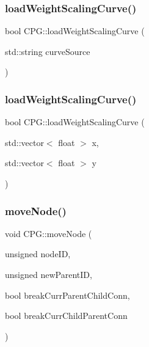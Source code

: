 \subsubsection{\texorpdfstring{load\+Weight\+Scaling\+Curve()}{loadWeightScalingCurve()}\hspace{0.1cm}{\footnotesize\ttfamily [1/2]}}
{\footnotesize\ttfamily bool C\+P\+G\+::load\+Weight\+Scaling\+Curve (\begin{DoxyParamCaption}\item[{std\+::string}]{curve\+Source }\end{DoxyParamCaption})}

\mbox{\label{classCPG_a8e1cb030a864fc7aecbe9e394b0b6e03}} 
\subsubsection{\texorpdfstring{load\+Weight\+Scaling\+Curve()}{loadWeightScalingCurve()}\hspace{0.1cm}{\footnotesize\ttfamily [2/2]}}
{\footnotesize\ttfamily bool C\+P\+G\+::load\+Weight\+Scaling\+Curve (\begin{DoxyParamCaption}\item[{std\+::vector$<$ float $>$}]{x,  }\item[{std\+::vector$<$ float $>$}]{y }\end{DoxyParamCaption})}

\mbox{\label{classCPG_a052ebefc34a7b11931b49136d7642584}} 
\subsubsection{\texorpdfstring{move\+Node()}{moveNode()}}
{\footnotesize\ttfamily void C\+P\+G\+::move\+Node (\begin{DoxyParamCaption}\item[{unsigned}]{node\+ID,  }\item[{unsigned}]{new\+Parent\+ID,  }\item[{bool}]{break\+Curr\+Parent\+Child\+Conn,  }\item[{bool}]{break\+Curr\+Child\+Parent\+Conn }\end{DoxyParamCaption})}

